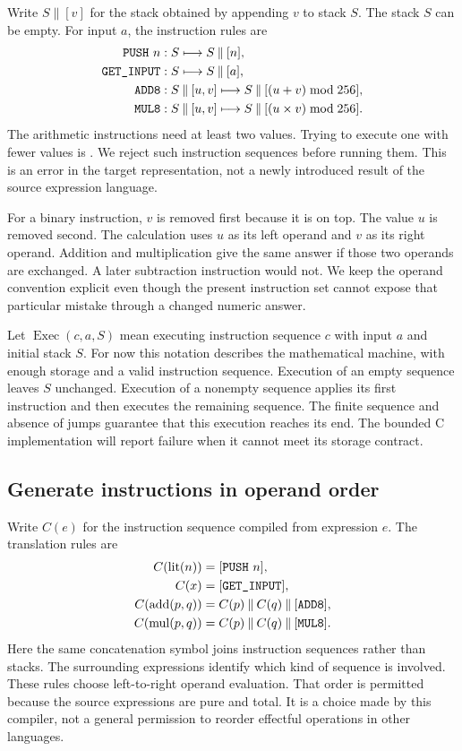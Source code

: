 Write $S\mathbin{\|}[v]$ for the stack obtained by appending $v$ to stack $S$.
The stack $S$ can be empty.
For input $a$, the instruction rules are
\begin{align*}
  \texttt{PUSH}\ n &: S \longmapsto S\mathbin{\|}[n],\\
  \texttt{GET\_INPUT} &: S \longmapsto S\mathbin{\|}[a],\\
  \texttt{ADD8} &: S\mathbin{\|}[u,v]
    \longmapsto S\mathbin{\|}[(u+v)\bmod256],\\
  \texttt{MUL8} &: S\mathbin{\|}[u,v]
    \longmapsto S\mathbin{\|}[(u\times v)\bmod256].
\end{align*}
The arithmetic instructions need at least two values.
Trying to execute one with fewer values is .
We reject such instruction sequences before running them.
This is an error in the target representation, not a newly introduced result of the source expression language.

For a binary instruction, $v$ is removed first because it is on top.
The value $u$ is removed second.
The calculation uses $u$ as its left operand and $v$ as its right operand.
Addition and multiplication give the same answer if those two operands are exchanged.
A later subtraction instruction would not.
We keep the operand convention explicit even though the present instruction set cannot expose that particular mistake through a changed numeric answer.

Let $\operatorname{Exec}(c,a,S)$ mean executing instruction sequence $c$ with input $a$ and initial stack $S$.
For now this notation describes the mathematical machine, with enough storage and a valid instruction sequence.
Execution of an empty sequence leaves $S$ unchanged.
Execution of a nonempty sequence applies its first instruction and then executes the remaining sequence.
The finite sequence and absence of jumps guarantee that this execution reaches its end.
The bounded C implementation will report failure when it cannot meet its storage contract.

\subsection{Generate instructions in operand order}
\label{sec:tiny-stack-generation}

Write $C(e)$ for the instruction sequence compiled from expression $e$.
The translation rules are
\begin{align*}
  C(\operatorname{lit}(n)) &= [\texttt{PUSH}\ n],\\
  C(x) &= [\texttt{GET\_INPUT}],\\
  C(\operatorname{add}(p,q)) &= C(p)\mathbin{\|}C(q)\mathbin{\|}[\texttt{ADD8}],\\
  C(\operatorname{mul}(p,q)) &= C(p)\mathbin{\|}C(q)\mathbin{\|}[\texttt{MUL8}].
\end{align*}
Here the same concatenation symbol joins instruction sequences rather than stacks.
The surrounding expressions identify which kind of sequence is involved.
These rules choose left-to-right operand evaluation.
That order is permitted because the source expressions are pure and total.
It is a choice made by this compiler, not a general permission to reorder effectful operations in other languages.

